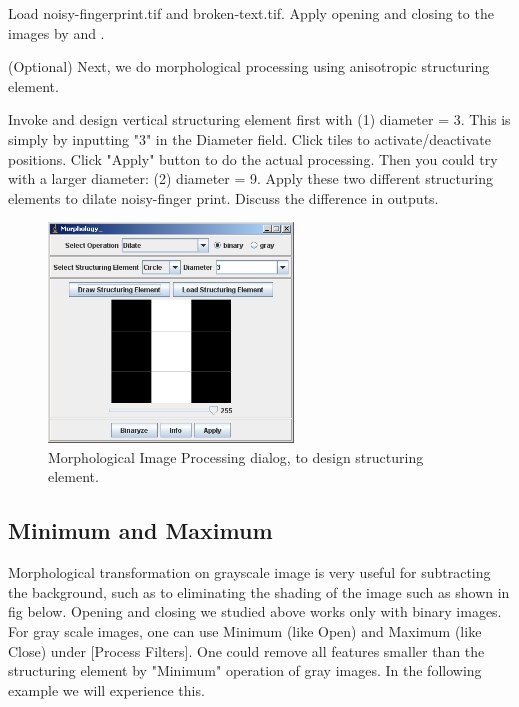 \begin{indentexercise}{1}
Load noisy-fingerprint.tif and broken-text.tif. Apply
opening and closing to the images by  and . 
\end{indentexercise}


\begin{indentexercise}{2}
(Optional) Next, we do morphological processing using anisotropic structuring
element. 

Invoke  and design vertical structuring element first with (1)
diameter = 3. This is simply by inputting
"3" in the Diameter field. Click tiles
to activate/deactivate positions. Click
"Apply" button to do the actual
processing. Then you could try with a larger diameter: (2) diameter =
9. Apply these two different structuring elements to dilate
noisy-finger print. Discuss the difference in outputs. 


\begin{figure}[htbp]
\begin{center}
\includegraphics[width=6.5cm]{fig/CMCIBasicCourse201102-img68.png}
\caption{ Morphological Image Processing dialog, to design structuring element.}
\label{fig:img68}
\end{center}
\end{figure}
\end{indentexercise}

\subsection{Minimum and Maximum}

Morphological transformation on grayscale image is very useful for
subtracting the background, such as to eliminating the shading of the
image such as shown in fig below. Opening and closing we studied above
works only with binary images. For gray scale images, one can use
Minimum (like Open) and Maximum (like Close) under [Process
Filters]. One could remove all features smaller than
the structuring element by "Minimum"
operation of gray images. In the following example we will experience
this.

